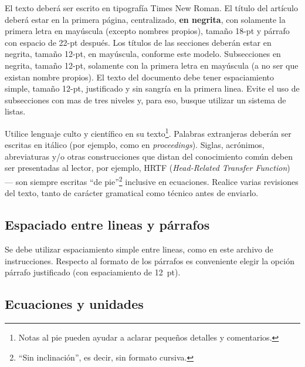 \documentclass[12pt, a4paper, twoside, twocolumn]{article}
\begin{document}
El texto deberá ser escrito en tipografía Times New Roman. El título del artículo deberá estar en la primera página, centralizado, \textbf{en negrita}, con solamente la primera letra en mayúscula (excepto nombres propios), tamaño 18-pt y párrafo con espacio de 22-pt después. Los títulos de las secciones deberán estar en negrita, tamaño 12-pt, en mayúscula, conforme este modelo. Subsecciones en negrita, tamaño 12-pt, solamente con la primera letra en mayúscula (a no ser que existan nombre propios). El texto del documento debe tener espaciamiento simple, tamaño 12-pt, justificado y sin sangría en la primera linea. Evite el uso de subsecciones con mas de tres niveles y, para eso, busque utilizar un sistema de listas.


Utilice lenguaje culto y científico en su texto\footnote{Notas al pie pueden ayudar a aclarar pequeños detalles y comentarios.}. Palabras extranjeras deberán ser escritas en itálico (por ejemplo, como en \textit{proceedings}). Siglas, acrónimos, abreviaturas y/o otras construcciones que distan del conocimiento común deben ser presentadas al lector, por ejemplo, HRTF (\textit{Head-Related Transfer Function}) --- son siempre escritas  ``de pie''\footnote{``Sin inclinación'', es decir, sin formato cursiva.} inclusive en ecuaciones. Realice varias revisiones del texto, tanto de carácter gramatical como técnico antes de enviarlo.

\subsection{Espaciado entre lineas y párrafos}

Se debe utilizar espaciamiento simple entre lineas, como en este archivo de instrucciones.
Respecto al formato de los párrafos es conveniente elegir la opción párrafo justificado (con espaciamiento de 12~pt).


\subsection{Ecuaciones y unidades}
\end{document}
